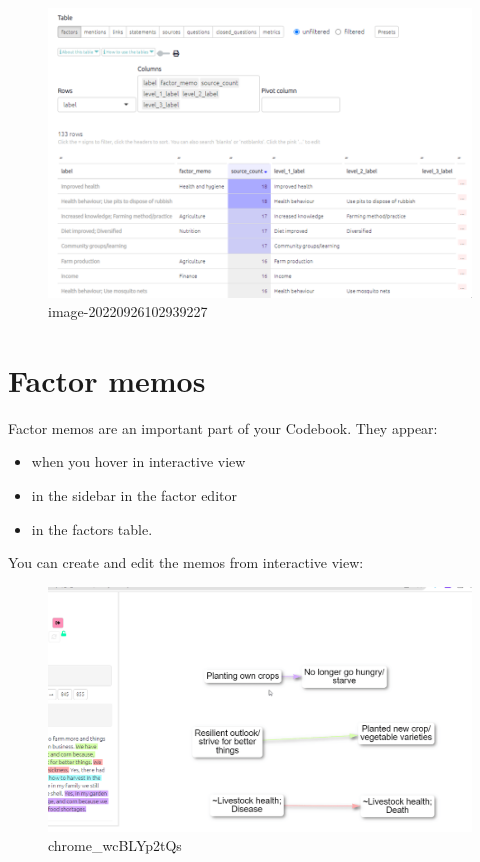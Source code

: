 \documentclass[
]{book}
\providecommand{\tightlist}{%
  \setlength{\itemsep}{0pt}\setlength{\parskip}{0pt}}
\begin{document}
\begin{figure}
\centering
\includegraphics[width=6.77083in,height=\textheight]{_assets/image-20220926102939227.png}
\caption{image-20220926102939227}
\end{figure}

\hypertarget{xfactormemos}{%
\section{Factor memos}\label{xfactormemos}}

Factor memos are an important part of your Codebook. They appear:

\begin{itemize}
\tightlist
\item
  when you hover in interactive view
\item
  in the sidebar in the factor editor
\item
  in the factors table.
\end{itemize}

You can create and edit the memos from interactive view:

\begin{figure}
\centering
\includegraphics[width=6.77083in,height=\textheight]{_assets/chrome_wcBLYp2tQs.gif}
\caption{chrome\_wcBLYp2tQs}
\end{figure}
\end{document}
